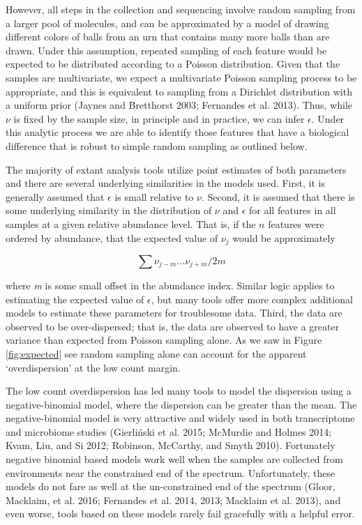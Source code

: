 \documentclass[onecolumn]{article}
\begin{document}
However, all steps in the collection and sequencing involve random sampling from a larger pool of molecules, and can be approximated by a model of drawing different colors of balls from an urn that contains many more balls than are drawn. Under this assumption, repeated sampling of each feature would be expected to be distributed according to a Poisson distribution. Given that the samples are multivariate, we expect a multivariate Poisson sampling process to be appropriate, and this is equivalent to sampling from a Dirichlet distribution with a uniform prior (Jaynes and Bretthorst 2003; Fernandes et al. 2013). Thus, while \(\nu\) is fixed by the sample size, in principle and in practice, we can infer \(\epsilon\). Under this analytic process we are able to identify those features that have a biological difference that is robust to simple random sampling as outlined below.

The majority of extant analysis tools utilize point estimates of both parameters and there are several underlying similarities in the models used. First, it is generally assumed that \(\epsilon\) is small relative to \(\nu\). Second, it is assumed that there is some underlying similarity in the distribution of \(\nu\) and \(\epsilon\) for all features in all samples at a given relative abundance level. That is, if the \(n\) features were ordered by abundance, that the expected value of \(\nu_j\) would be approximately

\begin{equation}
\sum \nu_{j-m} \ldots \nu_{j+m} / 2m
\end{equation}

where \textit{m} is some small offset in the abundance index. Similar logic applies to estimating the expected value of \(\epsilon\), but many tools offer more complex additional models to estimate these parameters for troublesome data. Third, the data are observed to be over-dispersed; that is, the data are observed to have a greater variance than expected from Poisson sampling alone. As we saw in Figure \ref{fig:expected} see random sampling alone can account for the apparent `overdispersion' at the low count margin.

The low count overdispersion has led many tools to model the dispersion using a negative-binomial model, where the dispersion can be greater than the mean. The negative-binomial model is very attractive and widely used in both transcriptome and microbiome studies (Gierliński et al. 2015; McMurdie and Holmes 2014; Kvam, Liu, and Si 2012; Robinson, McCarthy, and Smyth 2010). Fortunately negative binomial based models work well when the samples are collected from environments near the constrained end of the spectrum. Unfortunately, these models do not fare as well at the un-constrained end of the spectrum (Gloor, Macklaim, et al. 2016; Fernandes et al. 2014, 2013; Macklaim et al. 2013), and even worse, tools based on these models rarely fail gracefully with a helpful error.
\end{document}
